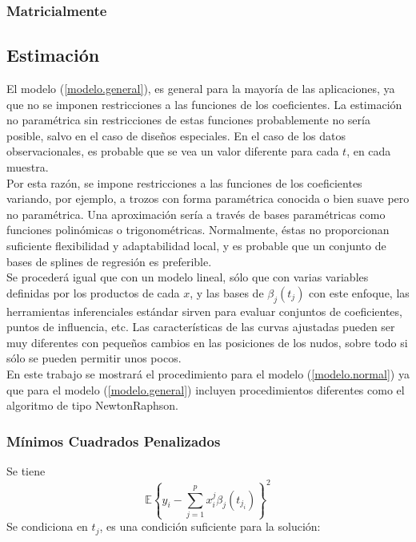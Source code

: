 \documentclass[
]{article}
\begin{document}
\hypertarget{matricialmente}{%
\subsubsection{Matricialmente}\label{matricialmente}}

\hypertarget{estimaciuxf3n}{%
\subsection{Estimación}\label{estimaciuxf3n}}

El modelo (\ref{modelo.general}), es general para la mayoría de las
aplicaciones, ya que no se imponen restricciones a las funciones de los
coeficientes. La estimación no paramétrica sin restricciones de estas
funciones probablemente no sería posible, salvo en el caso de diseños
especiales. En el caso de los datos observacionales, es probable que se
vea un valor diferente para cada \(t\), en cada muestra.\\
Por esta razón, se impone restricciones a las funciones de los
coeficientes variando, por ejemplo, a trozos con forma paramétrica
conocida o bien suave pero no paramétrica. Una aproximación sería a
través de bases paramétricas como funciones polinómicas o
trigonométricas. Normalmente, éstas no proporcionan suficiente
flexibilidad y adaptabilidad local, y es probable que un conjunto de
bases de splines de regresión es preferible.\\
Se procederá igual que con un modelo lineal, sólo que con varias
variables definidas por los productos de cada \(x\), y las bases de
\(\beta_j(t_j)\) con este enfoque, las herramientas inferenciales
estándar sirven para evaluar conjuntos de coeficientes, puntos de
influencia, etc. Las características de las curvas ajustadas pueden ser
muy diferentes con pequeños cambios en las posiciones de los nudos,
sobre todo si sólo se pueden permitir unos pocos.\\
En este trabajo se mostrará el procedimiento para el modelo
(\ref{modelo.normal}) ya que para el modelo (\ref{modelo.general})
incluyen procedimientos diferentes como el algoritmo de tipo
NewtonRaphson.

\hypertarget{muxednimos-cuadrados-penalizados}{%
\subsubsection{Mínimos Cuadrados
Penalizados}\label{muxednimos-cuadrados-penalizados}}

Se tiene
\[\mathbb{E}\left\{y_i-\sum_{j=1}^{p}x_i^j \beta_j(t_{j_i})\right\}^2\]
Se condiciona en \(t_j\), es una condición suficiente para la solución:
\end{document}
